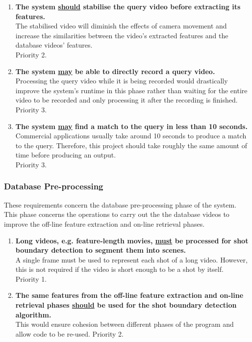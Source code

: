 \begin{enumerate}[label=F\arabic*,resume]
    \item \textbf{The system \underline{should} stabilise the query video before extracting its features.}\\
    The stabilised video will diminish the effects of camera movement and increase the similarities between the video's extracted features and the database videos' features.\\
    Priority 2.
    
    \item \textbf{The system \underline{may} be able to directly record a query video.}\\
    Processing the query video while it is being recorded would drastically improve the system's runtime in this phase rather than waiting for the entire video to be recorded and only processing it after the recording is finished.\\
    Priority 3.
    
    \item \textbf{The system \underline{may} find a match to the query in less than 10 seconds.}\\
    Commercial applications usually take around 10 seconds to produce a match to the query. Therefore, this project should take roughly the same amount of time before producing an output.\\
    Priority 3.
    
\end{enumerate}

\subsubsection{Database Pre-processing}

These requirements concern the database pre-processing phase of the system. This phase concerns the operations to carry out the the database videos to improve the off-line feature extraction and on-line retrieval phases.

\begin{enumerate}[label=F\arabic*,resume]

    \item \textbf{Long videos, e.g. feature-length movies, \underline{must} be processed for shot boundary detection to segment them into scenes.}\\
    A single frame must be used to represent each shot of a long video. However, this is not required if the video is short enough to be a shot by itself.\\
    Priority 1.
    
    \item \textbf{The same features from the off-line feature extraction and on-line retrieval phases \underline{should} be used for the shot boundary detection algorithm.}\\
    This would ensure cohesion between different phases of the program and allow code to be re-used.
    Priority 2.
    
\end{enumerate}

